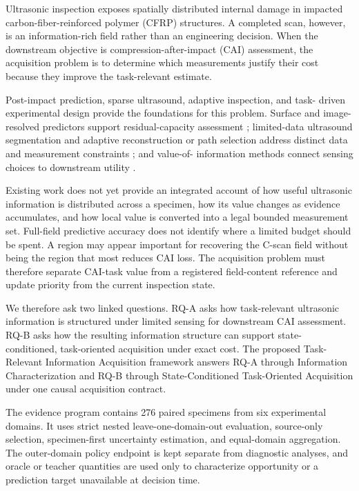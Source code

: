 \documentclass[preprint,12pt]{elsarticle}
\begin{document}
Ultrasonic inspection exposes spatially distributed internal damage in
impacted carbon-fiber-reinforced polymer (CFRP) structures. A completed scan,
however, is an information-rich field rather than an engineering decision.
When the downstream objective is compression-after-impact (CAI) assessment,
the acquisition problem is to determine which measurements justify their cost
because they improve the task-relevant estimate.

Post-impact prediction, sparse ultrasound, adaptive inspection, and task-
driven experimental design provide the foundations for this problem. Surface
and image-resolved predictors support residual-capacity assessment
\cite{hasebe2022internal,hasebe2025compression,bull2018image,mack2026cscan};
limited-data ultrasound segmentation and adaptive reconstruction or path
selection address distinct data and measurement constraints
\cite{nguyen2025sparse,ji2026adaptive,fuentes2020autonomous}; and value-of-
information methods connect sensing choices to downstream utility
\cite{blumberg2024experimental,memarzadeh2016value,cantero2020optimal}.

Existing work does not yet provide an integrated account of how useful
ultrasonic information is distributed across a specimen, how its value changes
as evidence accumulates, and how local value is converted into a legal bounded
measurement set. Full-field predictive accuracy does not identify where a
limited budget should be spent. A region may appear important for recovering
the C-scan field without being the region that most reduces CAI loss. The
acquisition problem must therefore separate CAI-task value from a registered
field-content reference and update priority from the current inspection state.

We therefore ask two linked questions. RQ-A asks how task-relevant ultrasonic
information is structured under limited sensing for downstream CAI assessment.
RQ-B asks how the resulting information structure can support state-
conditioned, task-oriented acquisition under exact cost. The proposed Task-
Relevant Information Acquisition framework answers RQ-A through Information
Characterization and RQ-B through State-Conditioned Task-Oriented Acquisition
under one causal acquisition contract.

The evidence program contains 276 paired specimens from six experimental
domains. It uses strict nested leave-one-domain-out evaluation, source-only
selection, specimen-first uncertainty estimation, and equal-domain
aggregation. The outer-domain policy endpoint is kept separate from diagnostic
analyses, and oracle or teacher quantities are used only to characterize
opportunity or a prediction target unavailable at decision time.
\end{document}
